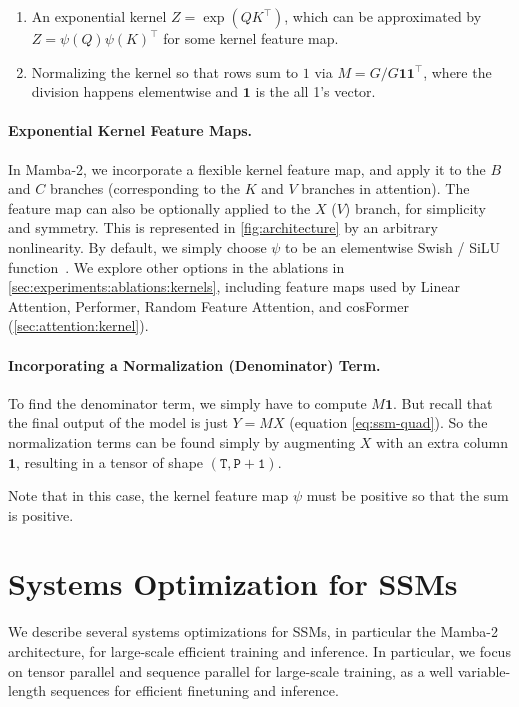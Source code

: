 \begin{enumerate}
  \item An exponential kernel $Z = \exp(QK^{\top})$, which can be approximated by $Z = \psi(Q)\psi(K)^{\top}$ for some kernel feature map.
  \item Normalizing the kernel so that rows sum to $1$ via $M = G / G \bm{1} \bm{1}^{\top}$, where the division happens elementwise and $\bm{1}$ is the all 1's vector.
\end{enumerate}

\paragraph{Exponential Kernel Feature Maps.}

In Mamba-2, we incorporate a flexible kernel feature map, and apply it to the $B$ and $C$ branches (corresponding to the $K$ and $V$ branches in attention). The feature map can also be optionally applied to the $X$ ($V$) branch, for simplicity and symmetry. This is represented in \ref{fig:architecture} by an arbitrary nonlinearity. By default, we simply choose $\psi$ to be an elementwise Swish / SiLU function~\citep{hendrycks2016gaussian,ramachandran2017swish}.
We explore other options in the ablations in \ref{sec:experiments:ablations:kernels},
including feature maps used by Linear Attention, Performer, Random Feature Attention, and cosFormer (\ref{sec:attention:kernel}).

\paragraph{Incorporating a Normalization (Denominator) Term.}

To find the denominator term, we simply have to compute $M \bm{1}$.
But recall that the final output of the model is just $Y = MX$ (equation \eqref{eq:ssm-quad}).
So the normalization terms can be found simply by augmenting $X$ with an extra column $\bm{1}$, resulting in a tensor of shape $\mathtt{(T, P+1)}$.

Note that in this case, the kernel feature map $\psi$ must be positive so that the sum is positive.

\section{Systems Optimization for SSMs}
\label{sec:systems}

We describe several systems optimizations for SSMs, in particular the Mamba-2 architecture, for large-scale efficient training and inference. In particular, we focus on tensor parallel and sequence parallel for large-scale training, as a well variable-length sequences for efficient finetuning and inference.

